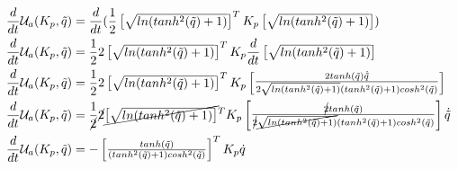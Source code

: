 \documentclass[12pt]{article}
\begin{document}
\begin{enumerate}
    \begin{equation}
        \begin{split}
            \frac{d}{dt}\mathcal{U}_a(K_p,\tilde{q})&=\frac{d}{dt}(\frac{1}{2}\begin{bmatrix}
                \sqrt{ln(tanh^2(\tilde{q})+1)}
            \end{bmatrix}^TK_p\begin{bmatrix}
                \sqrt{ln(tanh^2(\tilde{q})+1)}
            \end{bmatrix})\\
            \frac{d}{dt}\mathcal{U}_a(K_p,\tilde{q})&=\frac{1}{2}2\begin{bmatrix}
                \sqrt{ln(tanh^2(\tilde{q})+1)}
            \end{bmatrix}^TK_p\frac{d}{dt}\begin{bmatrix}
                \sqrt{ln(tanh^2(\tilde{q})+1)}
            \end{bmatrix}\\
            \frac{d}{dt}\mathcal{U}_a(K_p,\tilde{q})&=\frac{1}{2}2\begin{bmatrix}
                \sqrt{ln(tanh^2(\tilde{q})+1)}
            \end{bmatrix}^TK_p\begin{bmatrix}
                \frac{2tanh(\tilde{q})\dot{\tilde{q}}}{2\sqrt{ln(tanh^2(\tilde{q})+1)}(tanh^2(\tilde{q})+1)cosh^2(\tilde{q})}
            \end{bmatrix}\\
            \frac{d}{dt}\mathcal{U}_a(K_p,\tilde{q})&=\frac{1}{\cancel{2}}\cancel{2}\cancel{\begin{bmatrix}
                \sqrt{ln(tanh^2(\tilde{q})+1)}
            \end{bmatrix}}^TK_p\begin{bmatrix}
                \frac{\cancel{2}tanh(\tilde{q})}{\cancel{2}\cancel{\sqrt{ln(tanh^2(\tilde{q})+1)}}(tanh^2(\tilde{q})+1)cosh^2(\tilde{q})}
            \end{bmatrix}\dot{\tilde{q}}\\
            \frac{d}{dt}\mathcal{U}_a(K_p,\tilde{q})&=-
            \begin{bmatrix}
                \frac{tanh(\tilde{q})}{(tanh^2{(\tilde{q})}+1)cosh^2(\tilde{q})}
            \end{bmatrix}^TK_p\dot{q}\\
        \end{split}
        \label{eq:derivative_1}
    \end{equation}

\end{enumerate}
\end{document}
